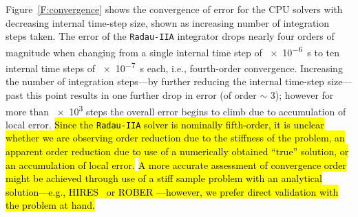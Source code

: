 \documentclass[preprint,review,11pt]{elsarticle}
\DeclareRobustCommand{\hlb}[1]{\sethlcolor{SkyBlue}\hl{#1}}
\begin{document}
Figure~\ref{F:convergence} shows the convergence of error for the CPU solvers with decreasing internal time-step size, shown as increasing number of integration steps taken.
The error of the \texttt{Radau-IIA} integrator drops nearly four orders of magnitude when changing from a single internal time step of \SI{e-6}{\second} to ten internal time steps of \SI{e-7}{\second} each, i.e., fourth-order convergence.
Increasing the number of integration steps---by further reducing the internal time-step size---past this point results in one further drop in error (of order $\sim$ 3); however for more than \num{e3} steps the overall error begins to climb due to accumulation of local error.
\hlb{Since the {\texttt{Radau-IIA}} solver is nominally fifth-order, it is unclear whether we are observing order reduction due to the stiffness of the problem, an apparent order reduction due to use of a numerically obtained ``true'' solution, or an accumulation of local error.}
\hlb{A more accurate assessment of convergence order might be achieved through use of a stiff sample problem with an analytical solution---e.g., HIRES~\cite{lioen1998test} or ROBER \cite{robertson1966solution}---however, we prefer direct validation with the problem at hand.}
\end{document}

